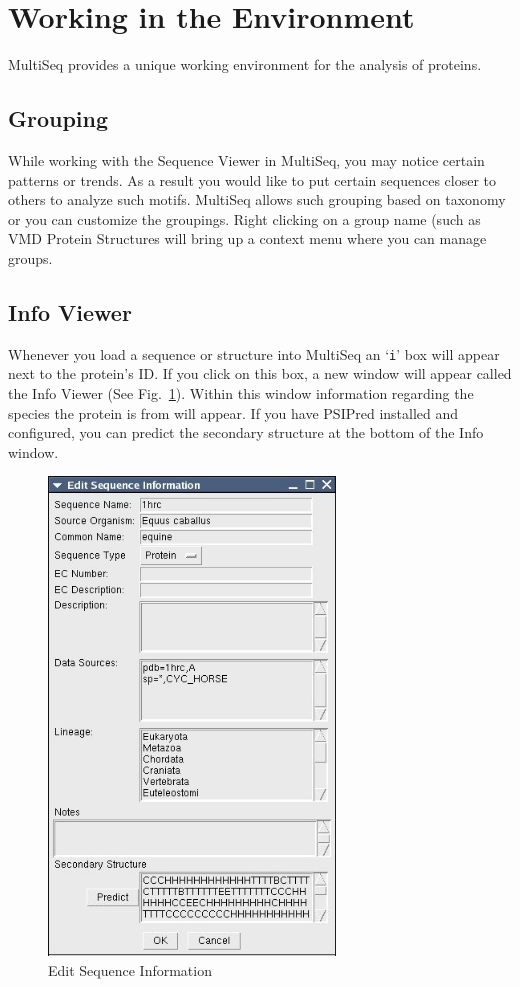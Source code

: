 \label{unit3}
\section{Working in the Environment}
MultiSeq provides a unique working environment for the analysis of
proteins.  

\subsection{Grouping}
While working with the Sequence Viewer in MultiSeq, you may notice
certain patterns or trends.  As a result you would like to put certain
sequences closer to others to analyze such motifs.  MultiSeq allows such
grouping based on taxonomy or you can customize the groupings.  Right
clicking on a group name (such as \textsf{VMD Protein Structures} will bring
up a context menu where you can manage groups.


\subsection{Info Viewer}
Whenever you load a sequence or structure into MultiSeq an `\texttt{i}' box will
appear next to the protein's ID.  If you click on this box, a new
window will appear called the \textsf{Info Viewer} (See
Fig.~\ref{fig:editSeqInfoWindow}).  Within this window
information regarding the species the protein is from will appear. If
you have PSIPred installed and configured, you can predict the secondary
structure at the bottom of the Info window.
\begin{figure}[here]
 \centerline{\includegraphics [width=3in]{./pictures/editSeqInfo.jpg}}
 \caption{Edit Sequence Information}%
 \label{fig:editSeqInfoWindow}
\end{figure}

